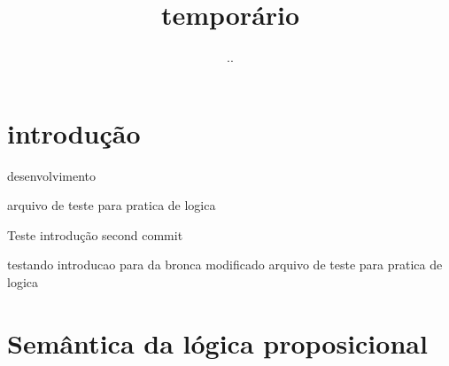 \documentclass{article}
\title{temporário}
\author{..}
\begin{document}
\maketitle

\section{introdução}


desenvolvimento

arquivo de teste para pratica de logica


Teste introdução
second commit

testando introducao para da bronca
modificado
arquivo de teste para pratica de logica
\section{Semântica da lógica proposicional}
\end{document}
